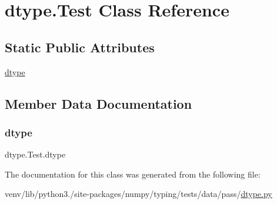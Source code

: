 \hypertarget{classdtype_1_1Test}{}\section{dtype.\+Test Class Reference}
\label{classdtype_1_1Test}
\subsection*{Static Public Attributes}
\begin{DoxyCompactItemize}
\item 
\hyperlink{classdtype_1_1Test_aa4ca096adaeccbcc1d2fc880440f8291}{dtype}
\end{DoxyCompactItemize}


\subsection{Member Data Documentation}
\mbox{\label{classdtype_1_1Test_aa4ca096adaeccbcc1d2fc880440f8291}} 
\subsubsection{\texorpdfstring{dtype}{dtype}}
{\footnotesize\ttfamily dtype.\+Test.\+dtype\hspace{0.3cm}{\ttfamily [static]}}



The documentation for this class was generated from the following file\+:\begin{DoxyCompactItemize}
\item 
venv/lib/python3./site-\/packages/numpy/typing/tests/data/pass/\hyperlink{pass_2dtype_8py}{dtype.\+py}\end{DoxyCompactItemize}
